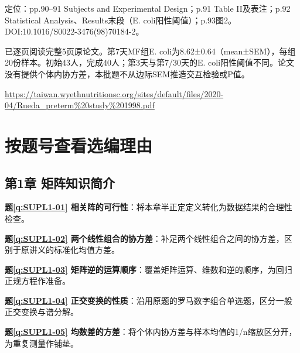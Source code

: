\par\noindent\begin{minipage}{\linewidth}\label{src:L5-RUEDA}
\par
定位：pp.90–91 Subjects and Experimental Design；p.91 Table II及表注；p.92 Statistical Analysis、Results末段（E. coli阳性阈值）；p.93图2。DOI:10.1016/S0022-3476(98)70184-2。\par
已逐页阅读完整5页原论文。第7天MF组E. coli为8.62±0.64（mean±SEM），每组20份样本。初始43人，完成40人；第3天与第7/30天的E. coli阳性阈值不同。论文没有提供个体内协方差，本批题不从边际SEM推造交互检验或P值。\par
{\small\url{https://taiwan.wyethnutritionsc.org/sites/default/files/2020-04/Rueda_preterm%20study%201998.pdf}}\par
\end{minipage}\par\medskip

\section*{按题号查看选编理由}\begingroup\small\setlength{\parskip}{2pt}
\subsection*{第1章 矩阵知识简介}

\noindent\textbf{题\ref*{q:SUPL1-01} 相关阵的可行性}：将本章半正定定义转化为数据结果的合理性检查。\par

\noindent\textbf{题\ref*{q:SUPL1-02} 两个线性组合的协方差}：补足两个线性组合之间的协方差，区别于原讲义的标准化均值方差。\par

\noindent\textbf{题\ref*{q:SUPL1-03} 矩阵逆的运算顺序}：覆盖矩阵运算、维数和逆的顺序，为回归正规方程作准备。\par

\noindent\textbf{题\ref*{q:SUPL1-04} 正交变换的性质}：沿用原题的罗马数字组合单选题，区分一般正交变换与谱分解。\par

\noindent\textbf{题\ref*{q:SUPL1-05} 均数差的方差}：将个体内协方差与样本均值的1/n缩放区分开，为重复测量作铺垫。\par

